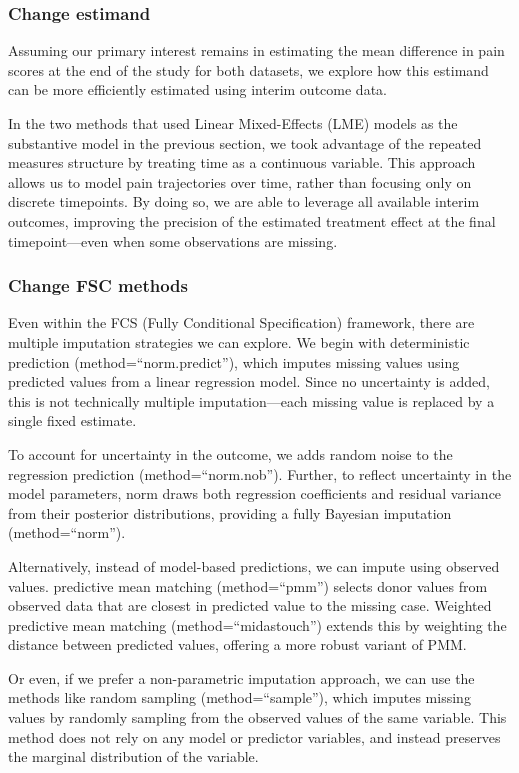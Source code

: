 \documentclass{article}
\begin{document}
\subsubsection{Change estimand}\label{change-estimand}

Assuming our primary interest remains in estimating the mean difference
in pain scores at the end of the study for both datasets, we explore how
this estimand can be more efficiently estimated using interim outcome
data.

In the two methods that used Linear Mixed-Effects (LME) models as the
substantive model in the previous section, we took advantage of the
repeated measures structure by treating time as a continuous variable.
This approach allows us to model pain trajectories over time, rather
than focusing only on discrete timepoints. By doing so, we are able to
leverage all available interim outcomes, improving the precision of the
estimated treatment effect at the final timepoint---even when some
observations are missing.

\subsubsection{Change FSC methods}\label{change-fsc-methods}

Even within the FCS (Fully Conditional Specification) framework, there
are multiple imputation strategies we can explore. We begin with
deterministic prediction (method=``norm.predict''), which imputes
missing values using predicted values from a linear regression model.
Since no uncertainty is added, this is not technically multiple
imputation---each missing value is replaced by a single fixed estimate.

To account for uncertainty in the outcome, we adds random noise to the
regression prediction (method=``norm.nob''). Further, to reflect
uncertainty in the model parameters, norm draws both regression
coefficients and residual variance from their posterior distributions,
providing a fully Bayesian imputation (method=``norm'').

Alternatively, instead of model-based predictions, we can impute using
observed values. predictive mean matching (method=``pmm'') selects donor
values from observed data that are closest in predicted value to the
missing case. Weighted predictive mean matching (method=``midastouch'')
extends this by weighting the distance between predicted values,
offering a more robust variant of PMM.

Or even, if we prefer a non-parametric imputation approach, we can use
the methods like random sampling (method=``sample''), which imputes
missing values by randomly sampling from the observed values of the same
variable. This method does not rely on any model or predictor variables,
and instead preserves the marginal distribution of the variable.
\end{document}

